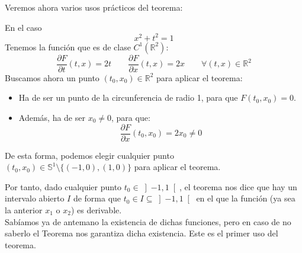 Veremos ahora varios usos prácticos del teorema:
\begin{ejemplo}
    En el caso
    \begin{equation*}
        x^2+t^2 = 1
    \end{equation*}
    Tenemos la función 
    que es de clase $C^1(\mathbb{R}^2)$:
    \begin{equation*}
        \dfrac{\partial F}{\partial t}(t,x) = 2t \qquad \dfrac{\partial F}{\partial x}(t,x) = 2x \qquad \forall (t,x)\in \mathbb{R}^2
    \end{equation*}
    Buscamos ahora un punto $(t_0,x_0)\in \mathbb{R}^2$ para aplicar el teorema:
    \begin{itemize}
        \item Ha de ser un punto de la circunferencia de radio 1, para que $F(t_0,x_0)=0$.
        \item Además, ha de ser $x_0 \neq 0$, para que:
            \begin{equation*}
                \dfrac{\partial F}{\partial x}(t_0,x_0) = 2x_0 \neq 0
            \end{equation*}
    \end{itemize}
    De esta forma, podemos elegir cualquier punto $(t_0,x_0)\in \mathbb{S}^1\setminus \{(-1,0),(1,0)\}$ para aplicar el teorema.

    Por tanto, dado cualquier punto $t_0\in \left]-1,1\right[$, el teorema nos dice que hay un intervalo abierto $I$ de forma que $t_0\in I \subseteq \left]-1,1\right[$ en el que la función (ya sea la anterior $x_1$ o $x_2$) es derivable.\\

    Sabíamos ya de antemano la existencia de dichas funciones, pero en caso de no saberlo el Teorema nos garantiza dicha existencia. Este es el primer uso del teorema.
\end{ejemplo}

